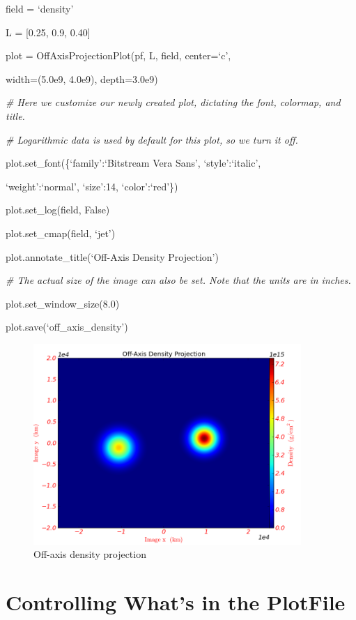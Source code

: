 field = `density'

L = [0.25, 0.9, 0.40]

plot = OffAxisProjectionPlot(pf, L, field, center=`c',

{\setlength{\parindent}{146pt}width=(5.0e9, 4.0e9), depth=3.0e9)}

{\it\# Here we customize our newly created plot, dictating the font, colormap, and title.}
{\setlength{\parskip}{0pt}

{\it\# Logarithmic data is used by default for this plot, so we turn it off.}

plot.set\_font(\{`family':`Bitstream Vera Sans', `style':`italic',
}

{\setlength{\parindent}{63.5pt}`weight':`normal', `size':14, `color':`red'\})}

plot.set\_log(field, False)

plot.set\_cmap(field, `jet')

plot.annotate\_title(`Off-Axis Density Projection')

{\it\# The actual size of the image can also be set. Note that the units are in inches.}
{\setlength{\parskip}{0pt}

plot.set\_window\_size(8.0)
}

plot.save(`off\_axis\_density')
\begin{figure}[h]
  \centering
  \includegraphics[width=4in]{Visualization/OffAxisProjection_density}
  \caption{Off-axis density projection}
\end{figure}

\section{Controlling What's in the PlotFile}

